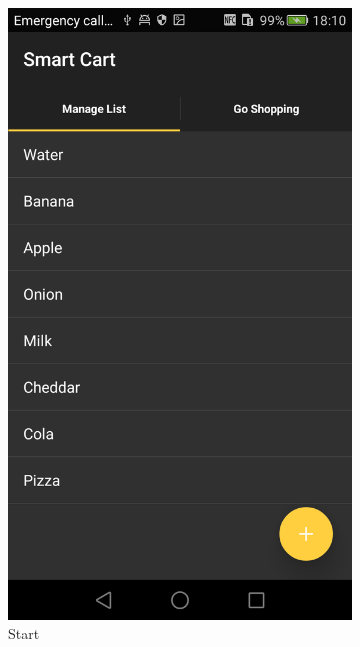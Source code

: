 \begin{figure}[h]
\captionsetup{justification=centering}
\begin{subfigure}{0.475\textwidth} 
\centering 
\includegraphics[height= 0.3\textheight]{res/usermanual/startApp.png}
\caption{Start}
\label{fig:start}
\end{subfigure} \hspace{0.05\textwidth}
\begin{subfigure}{0.475\textwidth}
\centering 

\end{subfigure}
\end{figure}
